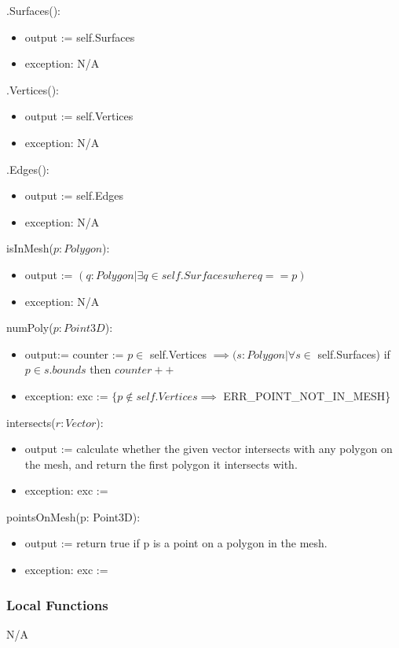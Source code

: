 \documentclass[12pt, titlepage]{article}
\begin{document}
\noindent .Surfaces():
\begin{itemize}
	\item output := self.Surfaces
	\item exception: N/A
\end{itemize}

\noindent .Vertices():
\begin{itemize}
	\item output := self.Vertices
	\item exception: N/A
\end{itemize}

\noindent .Edges():
\begin{itemize}
	\item output := self.Edges
	\item exception: N/A
\end{itemize}

\noindent isInMesh($p:Polygon$):
\begin{itemize}
	\item output := $(q:Polygon|\exists q \in self.Surfaces where q == p)$
	\item exception: N/A
\end{itemize}

\noindent numPoly($p:Point3D$):
\begin{itemize}
	\item output:=  counter := $p \in$ self.Vertices $\implies (s:Polygon| 
	\forall s \in$ self.Surfaces) if $p \in s.bounds$ then $counter++$
	\item exception: exc := $\{p \notin self.Vertices \implies$ 
	ERR\_POINT\_NOT\_IN\_MESH\}
\end{itemize}

\noindent intersects($r:Vector$):
\begin{itemize}
	\item output := calculate whether the given vector intersects with any 
	polygon on the mesh, and return the first polygon it intersects with.
	\item exception: exc :=
\end{itemize}

\noindent pointsOnMesh(p: Point3D):
\begin{itemize}
	\item output := return true if p is a point on a polygon in the mesh.
	\item exception: exc :=
\end{itemize}

\subsubsection{Local Functions}
N/A
\end{document}
